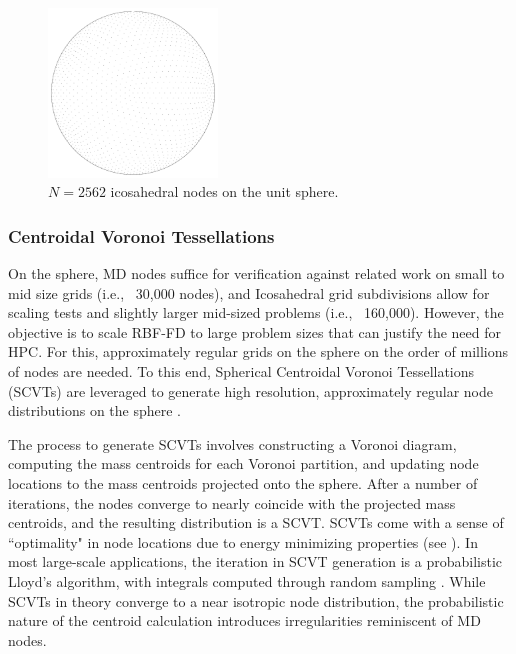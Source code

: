 \documentclass[11pt]{report}
\begin{document}
{\begin{figure} 
\centering
\includegraphics[width=0.4\textwidth]{rbffd_methods_content/grids/ICOS2562.pdf} 
\caption{$N=2562$ icosahedral nodes on the unit sphere.} 
\label{fig:icos_nodes}
\end{figure}

\subsubsection{Centroidal Voronoi Tessellations}

On the sphere, MD nodes suffice for verification against related work on small to mid size grids (i.e., ~30,000 nodes), and Icosahedral grid subdivisions allow for scaling tests and slightly larger mid-sized problems (i.e., ~160,000). However, the objective is to scale RBF-FD to large problem sizes that can justify the need for HPC. For this, approximately regular grids on the sphere on the order of millions of nodes are needed. To this end, Spherical Centroidal Voronoi Tessellations (SCVTs) are leveraged to generate high resolution, approximately regular node distributions on the sphere \cite{Du2003b, Womeldorff2008}. 

The process to generate SCVTs involves constructing a Voronoi diagram, computing the mass centroids for each Voronoi partition, and updating node locations to the mass centroids projected onto the sphere. After a number of iterations, the nodes converge to nearly coincide with the projected mass centroids, and the resulting distribution is a SCVT. SCVTs come with a sense of ``optimality" in node locations due to energy minimizing properties (see \cite{Du2003b}). 
In most large-scale applications, the iteration in SCVT generation is a probabilistic Lloyd's algorithm, with integrals computed through random sampling \cite{Womeldorff2008, Du2003b}. While SCVTs in theory converge to a near isotropic node distribution, the probabilistic nature of the centroid calculation introduces irregularities reminiscent of MD nodes. 

}
\end{document}
